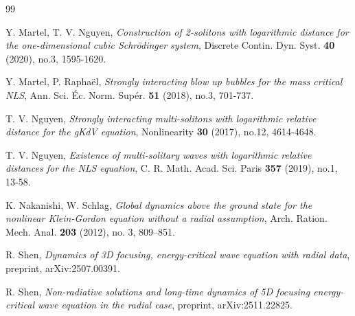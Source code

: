 \documentclass[reqno]{amsart}
\theoremstyle{plain}
\theoremstyle{definition}
\numberwithin{equation}{section}
\newcommand{\1}{\mathbbm{1}}
\begin{document}
\begin{thebibliography}{99}




 Y. Martel, T. V. Nguyen,
\textit{Construction of 2-solitons with logarithmic distance for the one-dimensional cubic Schr\"{o}dinger system},
Discrete Contin. Dyn. Syst. \textbf{40} (2020), no.3, 1595-1620.


 Y. Martel, P. Raphaël, 
\textit{Strongly interacting blow up bubbles for the mass critical NLS},
Ann. Sci. Éc. Norm. Supér. \textbf{51} (2018), no.3, 701-737.

 T. V. Nguyen,
\textit{Strongly interacting multi-solitons with logarithmic relative distance for the gKdV equation},
Nonlinearity \textbf{30} (2017), no.12, 4614-4648.


 T. V. Nguyen,
\textit{Existence of multi-solitary waves with logarithmic relative distances for the NLS equation},
C. R. Math. Acad. Sci. Paris \textbf{357} (2019), no.1, 13-58.



K. Nakanishi, W. Schlag, 
\textit{Global dynamics above the ground state for the nonlinear Klein-Gordon equation without a radial assumption}, 
Arch. Ration. Mech. Anal. 
{\bf 203} (2012), no. 3, 809--851. 







 R. Shen,
\textit{Dynamics of 3D focusing, energy-critical wave equation with radial data},
preprint, arXiv:2507.00391.

 R. Shen,
\textit{Non-radiative solutions and long-time dynamics of 5D focusing energy-critical wave equation in the radial case},
preprint, arXiv:2511.22825.



\end{thebibliography}
\end{document}
